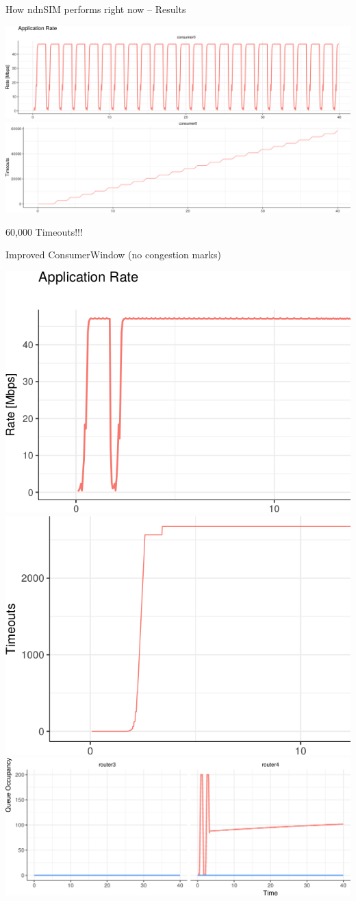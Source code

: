 \begin{frame}{How ndnSIM performs right now -- Results}

\includegraphics[width=\linewidth]{figs/cons1.png}\\
\pause
\includegraphics[width=\linewidth]{figs/cons2.png}

60,000 Timeouts!!!

\end{frame}


\begin{frame}{Improved ConsumerWindow (no congestion marks)}

\includegraphics[width=0.48\linewidth]{figs/cons_new_rate.png}
\hspace{.1em}
\pause
\includegraphics[width=0.48\linewidth]{figs/cons_new_timeouts.png}\\
\pause
\includegraphics[width=\linewidth]{figs/cons_new_queue.png}

\end{frame}


